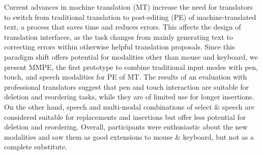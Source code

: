 Current advances in machine translation (MT) increase the need for translators to switch from traditional translation to post-editing (PE) of machine-translated text, a process that saves time and reduces errors. This affects the design of translation interfaces, as the task changes from mainly generating text to correcting errors within otherwise helpful translation proposals. Since this paradigm shift offers potential for modalities other than mouse and keyboard, we present MMPE, the first prototype to combine traditional input modes with pen, touch, and speech modalities for PE of MT. The results of an evaluation with professional translators suggest that pen and touch interaction are suitable for deletion and reordering tasks, while they are of limited use for longer insertions. On the other hand, speech and multi-modal combinations of select \& speech are considered suitable for replacements and insertions but offer less potential for deletion and reordering. Overall, participants were enthusiastic about the new modalities and saw them as good extensions to mouse \& keyboard, but not as a complete substitute.
